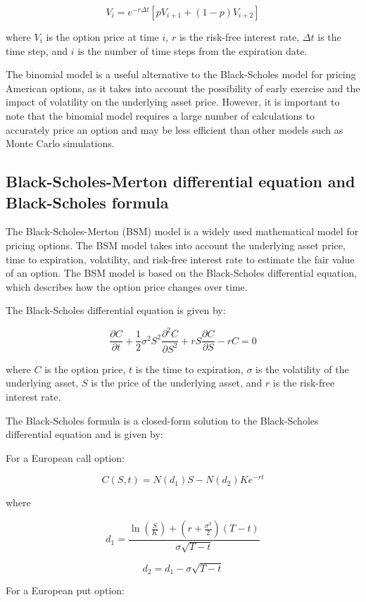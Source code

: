 \documentclass[12pt, a4paper, oneside]{article}
\begin{document}
$$V_i = e^{-r\Delta t}[pV_{i+1} + (1-p)V_{i+2}]$$

where $V_i$ is the option price at time $i$, $r$ is the risk-free interest rate, $\Delta t$ is the time step, and $i$ is the number of time steps from the expiration date.

The binomial model is a useful alternative to the Black-Scholes model for pricing American options, as it takes into account the possibility of early exercise and the impact of volatility on the underlying asset price. However, it is important to note that the binomial model requires a large number of calculations to accurately price an option and may be less efficient than other models such as Monte Carlo simulations.




\subsection{ Black-Scholes-Merton differential equation and Black-Scholes formula }
The Black-Scholes-Merton (BSM) model is a widely used mathematical model for pricing options. The BSM model takes into account the underlying asset price, time to expiration, volatility, and risk-free interest rate to estimate the fair value of an option. The BSM model is based on the Black-Scholes differential equation, which describes how the option price changes over time.

The Black-Scholes differential equation is given by:

$$\frac{\partial C}{\partial t} + \frac{1}{2} \sigma^2 S^2 \frac{\partial^2 C}{\partial S^2} + rS \frac{\partial C}{\partial S} - rC = 0$$

where $C$ is the option price, $t$ is the time to expiration, $\sigma$ is the volatility of the underlying asset, $S$ is the price of the underlying asset, and $r$ is the risk-free interest rate.

The Black-Scholes formula is a closed-form solution to the Black-Scholes differential equation and is given by:

For a European call option:

$$C(S,t) = N(d_1)S - N(d_2)Ke^{-rt}$$

where

$$d_1 = \frac{\ln{\left(\frac{S}{K}\right)} + \left(r + \frac{\sigma^2}{2}\right)(T-t)}{\sigma \sqrt{T-t}}$$

$$d_2 = d_1 - \sigma \sqrt{T-t}$$

For a European put option:
\end{document}

